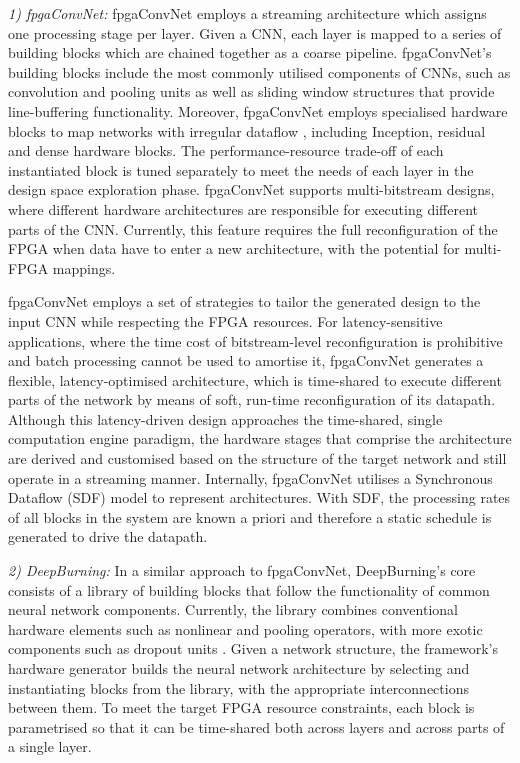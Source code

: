 \documentclass[format=acmsmall, review=false, screen=true]{acmart}
\begin{document}
\textit{1) fpgaConvNet:}
fpgaConvNet employs a streaming architecture which assigns one processing stage per layer. Given a CNN, each layer is mapped to a series of building blocks which are chained together as a coarse pipeline. fpgaConvNet's building blocks include the most commonly utilised components of CNNs, such as convolution and pooling units as well as sliding window structures that provide line-buffering functionality. {\color{black}Moreover, fpgaConvNet employs specialised hardware blocks to map networks with irregular dataflow \cite{Szegedy2014}\cite{Szegedy_2016}\cite{He_2016}\cite{huang2017densely}, including Inception, residual and dense hardware blocks.} The performance-resource trade-off of each instantiated block is tuned separately to meet the needs of each layer in the design space exploration phase. fpgaConvNet supports multi-bitstream designs, where different hardware architectures are responsible for executing different parts of the CNN. Currently, this feature requires the full reconfiguration of the FPGA when data have to enter a new architecture, with the potential for multi-FPGA mappings. 

fpgaConvNet employs a set of strategies to tailor the generated design to the input CNN while respecting the FPGA resources. {\color{black}For latency-sensitive applications, where the time cost of bitstream-level reconfiguration is prohibitive and batch processing cannot be used to amortise it, fpgaConvNet generates a flexible, latency-optimised architecture, which is time-shared to execute different parts of the network by means of soft, run-time reconfiguration of its datapath. Although this latency-driven design approaches the time-shared, single computation engine paradigm, the hardware stages that comprise the architecture are derived and customised based on the structure of the target network and still operate in a streaming manner.} Internally, fpgaConvNet utilises a Synchronous Dataflow (SDF) model \cite{Lee_1987} to represent architectures. With SDF, the processing rates of all blocks in the system are known a priori and therefore a static schedule is generated to drive the datapath.

\textit{2) DeepBurning:}
In a similar approach to fpgaConvNet, DeepBurning's core consists of a library of building blocks that follow the functionality of common neural network components. Currently, the library combines conventional hardware elements such as nonlinear and pooling operators, with  more exotic components such as dropout units \cite{srivastava14a}. Given a network structure, the framework's hardware generator builds the neural network architecture by selecting and instantiating blocks from the library, with the appropriate interconnections between them. To meet the target FPGA resource constraints, each block is parametrised so that it can be time-shared both across layers and across parts of a single layer.
\end{document}

